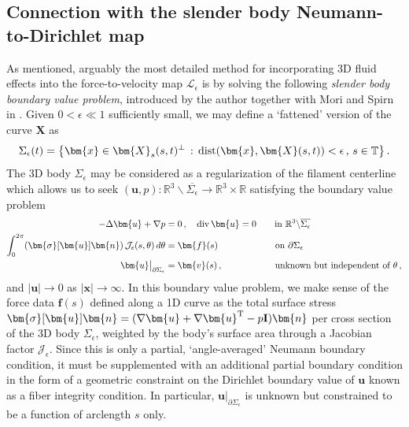 \documentclass[11pt,reqno]{amsart}
\newcommand{\R}{\mathbb{R}}
\newcommand{\T}{\mathbb{T}}
\newcommand{\bu}{\bm{u}}
\newcommand{\bx}{\bm{x}}
\newcommand{\X}{\bm{X}}
\newcommand{\bv}{\bm{v}}
\newcommand{\p}{\partial}
\renewcommand{\div}{{\rm{div}\,}}
\newcommand{\abs}[1]{\left\lvert #1 \right\rvert}
\newcommand{\mc}[1]{\mathcal{#1}}
\numberwithin{equation}{section}
\theoremstyle{definition}
\begin{document}
 




\subsection{Connection with the slender body Neumann-to-Dirichlet map}\label{subsec:SB_NtD}
As mentioned, arguably the most detailed method for incorporating 3D fluid effects into the force-to-velocity map $\mc{L}_\epsilon$ is by solving the following \emph{slender body boundary value problem}, introduced by the author together with Mori and Spirn in \cite{closed_loop,free_ends}. Given $0<\epsilon\ll1$ sufficiently small, we may define a `fattened' version of the curve $\X$ as 
\begin{equation}\label{eq:SigmaEps}
  \Sigma_\epsilon(t) = \big\{ \bx\in \X_s(s,t)^\perp\,:\, {\rm dist}(\bx,\X(s,t))<\epsilon\,, \, s\in \T \big\}\,.
\end{equation}
The 3D body $\Sigma_\epsilon$ may be considered as a regularization of the filament centerline which allows us to seek $(\bu,p): \R^3\backslash \overline{\Sigma_\epsilon} \to \R^3\times\R$ satisfying the boundary value problem
\begin{equation}\label{eq:SB_PDE}
\begin{aligned}
-\Delta \bu +\nabla p &= 0\,, \quad \div\bu=0 \qquad \text{in }\R^3\backslash \overline{\Sigma_\epsilon} \\
\int_0^{2\pi}(\bm{\sigma}[\bu]\bm{n}) \, \mc{J}_\epsilon(s,\theta)\,d\theta &= \bm{f}(s) \qquad\qquad\qquad\; \text{on }\p\Sigma_\epsilon \\
\bu\big|_{\p\Sigma_\epsilon} &= \bv(s)\,, \qquad\qquad\quad\;\;\, \text{unknown but independent of }\theta\,,   
\end{aligned}
\end{equation}
and $\abs{\bu}\to 0$ as $\abs{\bx}\to\infty$. In this boundary value problem, we make sense of the force data $\bm{f}(s)$ defined along a 1D curve as the total surface stress $\bm{\sigma}[\bu]\bm{n}= (\nabla\bu+\nabla\bu^{\rm T}-p{\bf I})\bm{n}$ per cross section of the 3D body $\Sigma_\epsilon$, weighted by the body's surface area through a Jacobian factor $\mc{J}_\epsilon$. Since this is only a partial, `angle-averaged' Neumann boundary condition, it must be supplemented with an additional partial boundary condition in the form of a geometric constraint on the Dirichlet boundary value of $\bu$ known as a fiber integrity condition. In particular, $\bu\big|_{\p\Sigma_\epsilon}$ is unknown but constrained to be a function of arclength $s$ only. 
\end{document}
